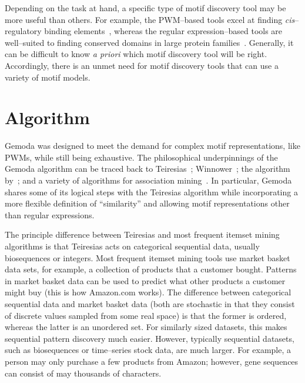 Depending on the task at hand, a specific type of motif discovery
tool may be more useful than others.  For example, the PWM--based
tools excel at finding \textit{cis}--regulatory binding
elements~\citep{tompa2005assessing}, whereas the regular
expression--based tools are well--suited to finding conserved
domains in large protein families~\citep{rigoutsos1999dictionary}.
Generally, it can be difficult to know \textit{a priori} which motif
discovery tool will be right.  Accordingly, there is an unmet need
for motif discovery tools that can use a variety of motif models.


\section{Algorithm}

    Gemoda was designed to meet the demand for complex
    motif representations, like PWMs, while still
    being exhaustive.  The philosophical underpinnings
    of the Gemoda algorithm can be traced back to
    Teiresias~\citep{rigoutsos1998combinatorial};
    Winnower~\citep{pevzner2000combinatorial}; the
    algorithm by~\citep{mancheron2003pattern}; and
    a variety of algorithms for association
    mining~\citep{zaki2000scalable,zaki1998theoretical}.
    In particular, Gemoda shares some of its logical steps
    with the Teiresias algorithm while incorporating a
    more flexible definition of ``similarity'' and allowing
    motif representations other than regular expressions.

The principle difference between Teiresias and most frequent itemset
mining algorithms is that Teiresias acts on categorical sequential
 data, usually biosequences or integers.  Most frequent itemset mining tools use market
basket data sets, for example, a collection of products that a
customer bought.  Patterns in market basket data can be used to
predict what other products a customer might buy (this is how
Amazon.com works). The difference between categorical sequential
data and market basket data (both are stochastic in that they
consist of discrete values sampled from some real space) is that the
former is ordered, whereas the latter is an unordered set.  For
similarly sized datasets, this makes sequential pattern discovery
much easier. However, typically sequential datasets, such as
biosequences or time--series stock data, are much larger.  For
example, a person may only purchase a few products from Amazon;
however, gene sequences can consist of may thousands of characters.

